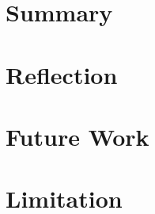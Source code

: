 \documentclass{l4proj}
\begin{document}
\section{Summary}
\section{Reflection}
\section{Future Work}
\section{Limitation}

%
% 
\end{document}
